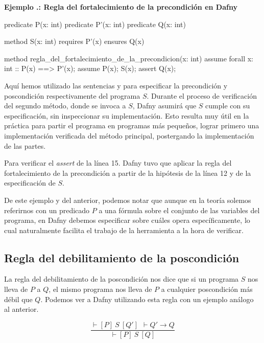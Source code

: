 \documentclass[12pt, a4paper, openany, fleqn]{book}
\newcounter{example}[chapter]
\renewcommand{\theexample}{\thechapter.\arabic{example}}
\newcommand{\example}[1]{
  \refstepcounter{example} %
  \vspace{1em}
  \noindent\textbf{Ejemplo \theexample: #1}
}
\newcommand{\hoareTheorem}[3]{\ensuremath{\vdash[#1]\ #2\ [#3]}}
\newcommand{\inferenceRule}[2]{
    \begin{equation*}
        \frac{#1}{#2}
    \end{equation*}
}
\begin{document}
    \example{Regla del fortalecimiento de la precondición en Dafny}
    \vspace{1em}
    \begin{greenbox}
    \begin{dafny}[gobble=8]
        predicate P(x: int)
        predicate P'(x: int)
        predicate Q(x: int)

        method S(x: int)
            requires P'(x)
            ensures Q(x)

        method regla_del_fortalecimiento_de_la_precondicion(x: int)
        {
            assume forall x: int :: P(x) ==> P'(x);
            assume P(x);
            S(x);
            assert Q(x); 
        }
    \end{dafny}
    \end{greenbox}
    \vspace{1em}
    Aquí hemos utilizado las sentencias  y  para especificar la precondición y poscondición respectivamente del programa $S$. Durante el proceso de verificación del segundo método, donde se invoca a $S$, Dafny asumirá que $S$ cumple con su especificación, sin inspeccionar su implementación. Esto resulta muy útil en la práctica para partir el programa en programas más pequeños, lograr primero una implementación verificada del método principal, postergando la implementación de las partes.

    Para verificar el \textit{assert} de la línea 15. Dafny tuvo que aplicar la regla del fortalecimiento de la precondición a partir de la hipótesis de la línea 12 y de la especificación de $S$.

    De este ejemplo y del anterior, podemos notar que aunque en la teoría solemos referirnos con un predicado $P$ a una fórmula sobre el conjunto de las variables del programa, en Dafny debemos especificar sobre cuáles opera específicamente, lo cual naturalmente facilita el trabajo de la herramienta a la hora de verificar.
    \vspace{1em}

    \subsection{Regla del debilitamiento de la poscondición}
    La regla del debilitamiento de la poscondición nos dice que si un programa $S$ nos lleva de $P$ a $Q$, el mismo programa nos lleva de $P$ a cualquier poscondición más débil que $Q$. Podemos ver a Dafny utilizando esta regla con un ejemplo análogo al anterior.
    \inferenceRule{\hoareTheorem{P}{S}{Q'}\ \ \vdash Q' \rightarrow Q}{\hoareTheorem{P}{S}{Q}}
\end{document}
